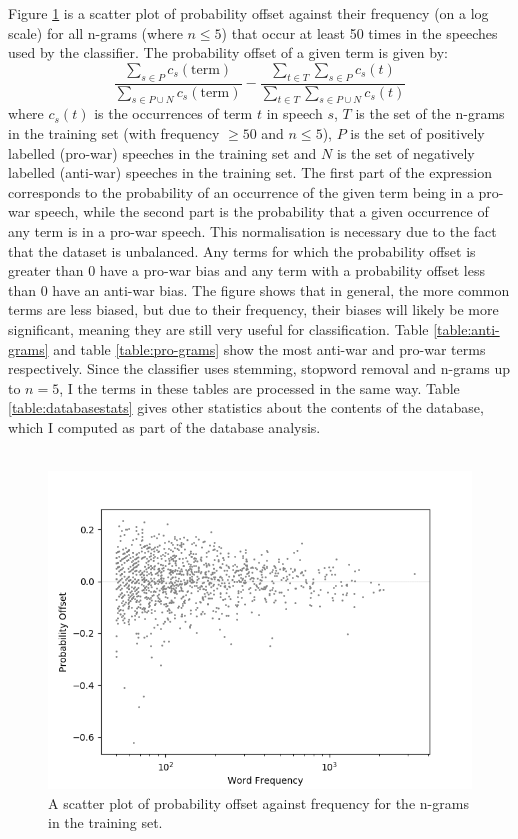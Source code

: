 \documentclass[12pt,a4paper,twoside,openright]{report}
\begin{document}
Figure \ref{fig:ngramoffset} is a scatter plot of probability offset against their frequency (on a log scale) for all n-grams (where $n \le 5$) that occur at least 50 times in the speeches used by the classifier. The probability offset of a given term is given by:
\begin{equation}
	\frac{\sum_{s \in P}c_{s}(\text{term})}{\sum_{s \in P \cup N}c_{s}(\text{term})} - \frac{\sum_{t \in T}\sum_{s \in P}c_{s}(t)}{\sum_{t \in T}\sum_{s \in P \cup N}c_{s}(t)}
\end{equation}
where $c_{s}(t)$ is the occurrences of term $t$ in speech $s$, $T$ is the set of the n-grams in the training set (with frequency $\ge 50$ and $n \le 5$), $P$ is the set of positively labelled (pro-war) speeches in the training set and $N$ is the set of negatively labelled (anti-war) speeches in the training set. The first part of the expression corresponds to the probability of an occurrence of the given term being in a pro-war speech, while the second part is the probability that a given occurrence of any term is in a pro-war speech. This normalisation is necessary due to the fact that the dataset is unbalanced. Any terms for which the probability offset is greater than 0 have a pro-war bias and any term with a probability offset less than 0 have an anti-war bias. The figure shows that in general, the more common terms are less biased, but due to their frequency, their biases will likely be more significant, meaning they are still very useful for classification. Table \ref{table:anti-grams} and table \ref{table:pro-grams} show the most anti-war and pro-war terms respectively. Since the classifier uses stemming, stopword removal and n-grams up to $n=5$, I the terms in these tables are processed in the same way. Table \ref{table:databasestats} gives other statistics about the contents of the database, which I computed as part of the database analysis.
\\\\
\begin{figure}
	\begin{center}
		\includegraphics[scale=0.8]{figs/ngramoffset.png}
	\end{center}
	\caption{A scatter plot of probability offset against frequency for the n-grams in the training set.}
	\label{fig:ngramoffset}
\end{figure} 
\end{document}
